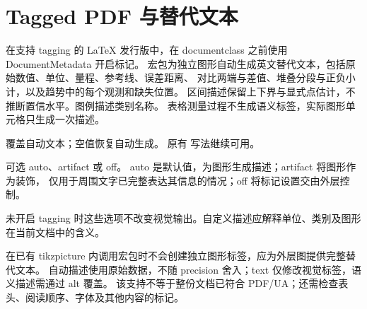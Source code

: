 \section{Tagged PDF 与替代文本}
\label{sec:manual-accessibility}
在支持 tagging 的 LaTeX 发行版中，在 documentclass 之前使用 DocumentMetadata 开启标记。
宏包为独立图形自动生成英文替代文本，包括原始数值、单位、量程、参考线、误差距离、
对比两端与差值、堆叠分段与正负小计，以及趋势中的每个观测和缺失位置。
区间描述保留上下界与显式点估计，不推断置信水平。图例描述类别名称。
表格测量过程不生成语义标签，实际图形单元格只生成一次描述。


 覆盖自动文本；空值恢复自动生成。
原有  写法继续可用。

 可选 auto、artifact 或 off。
auto 是默认值，为图形生成描述；artifact 将图形作为装饰，
仅用于周围文字已完整表达其信息的情况；off 将标记设置交由外层控制。

未开启 tagging 时这些选项不改变视觉输出。自定义描述应解释单位、类别及图形在当前文档中的含义。

在已有 tikzpicture 内调用宏包时不会创建独立图形标签，应为外层图提供完整替代文本。
自动描述使用原始数据，不随 precision 舍入；text 仅修改视觉标签，语义描述需通过 alt 覆盖。
该支持不等于整份文档已符合 PDF/UA；还需检查表头、阅读顺序、字体及其他内容的标记。
